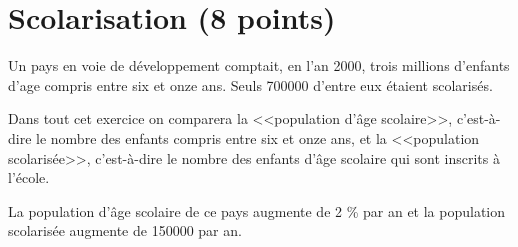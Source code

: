 \section{Scolarisation (8 points)}

Un pays en voie de développement comptait, en l'an 2000, trois millions d'enfants d'age compris entre six et onze ans. Seuls \num{700000} d'entre eux étaient scolarisés.

Dans tout cet exercice on comparera la <<population d'âge scolaire>>, c'est-à-dire le nombre des enfants compris entre six et onze ans, et la <<population scolarisée>>, c'est-à-dire le nombre des enfants d'âge scolaire qui sont inscrits à l'école.

La population d'âge scolaire de ce pays augmente de 2 \% par an et la population scolarisée augmente de \num{150000} par an.

